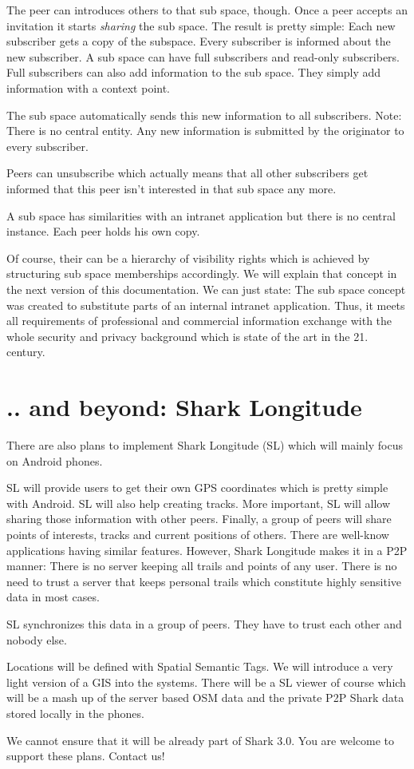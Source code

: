 The peer can introduces others to that sub space, though. Once a peer accepts an invitation it starts {\it sharing} the sub space. The result is pretty simple: Each new subscriber gets a copy of the subspace. Every subscriber is informed about the new subscriber. A sub space can have full subscribers and read-only subscribers. Full subscribers can also add information to the sub space. They simply add information with a context point.

The sub space automatically sends this new information to all subscribers. Note: There is no central entity. Any new information is submitted by the originator to every subscriber. 

Peers can unsubscribe which actually means that all other subscribers get informed that this peer isn't interested in that sub space any more.

A sub space has similarities with an intranet application but there is no central instance. Each peer holds his own copy.

Of course, their can be a hierarchy of visibility rights which is achieved by structuring sub space memberships accordingly. We will explain that concept in the next version of this documentation. We can just state: The sub space concept was created to substitute parts of an internal intranet application. Thus, it meets all requirements of professional and commercial information exchange with the whole security and privacy background which is state of the art in the 21. century.

\section{.. and beyond: Shark Longitude}
There are also plans to implement Shark Longitude (SL) which will mainly focus on Android phones.

SL will provide users to get their own GPS coordinates which is pretty simple with Android. SL will also help creating tracks. More important, SL will allow sharing those information with other peers. Finally, a group of peers will share points of interests, tracks and current positions of others. There are well-know
applications having similar features. However, Shark Longitude makes it in a P2P manner: There is no server keeping all trails and points of any user. There is no need to trust a server that keeps personal trails which constitute highly sensitive data in most cases.

SL synchronizes this data in a group of peers. They have to trust each other and nobody else.

Locations will be defined with Spatial Semantic Tags. We will introduce a very light version of a GIS into the systems. There will be a SL viewer of course which will be a mash up of the server based OSM data and the private P2P Shark data stored locally in the phones.

We cannot ensure that it will be already part of Shark 3.0. You are welcome to support these plans. Contact us!
